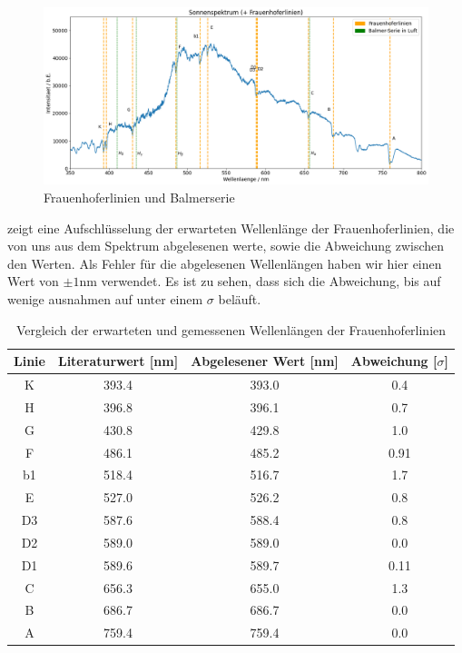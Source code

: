 \begin{figure}[H]
  \centering
  \includegraphics[width=\textwidth]{files/plots/spektrum_frauenhofer_balmer.png}
  \caption{Frauenhoferlinien und Balmerserie}
  \label{fig:spektrum_frauenhofer_balmer}
\end{figure}

 zeigt eine Aufschlüsselung der erwarteten Wellenlänge der Frauenhoferlinien, die von uns aus dem Spektrum abgelesenen werte, sowie die Abweichung zwischen den Werten. Als Fehler für die abgelesenen Wellenlängen haben wir hier einen Wert von $\pm 1 \si{\nano\meter}$ verwendet. Es ist zu sehen, dass sich die Abweichung, bis auf wenige ausnahmen auf unter einem $\sigma$ beläuft.

\begin{table}[h]
  \centering
  \caption{Vergleich der erwarteten und gemessenen Wellenlängen der Frauenhoferlinien}
  \vspace*{0.5em}
  \begin{tabular}{c|c|c|c}
      \hline
      Linie & Literaturwert [nm] & Abgelesener Wert [nm] & Abweichung [$\sigma$] \\
      \hline
      K  & 393.4 & 393.0 & 0.4 \\
      H  & 396.8 & 396.1 & 0.7 \\
      G  & 430.8 & 429.8 & 1.0 \\
      F  & 486.1 & 485.2 & 0.91 \\
      b1 & 518.4 & 516.7 & 1.7 \\
      E  & 527.0 & 526.2 & 0.8 \\
      D3 & 587.6 & 588.4 & 0.8 \\
      D2 & 589.0 & 589.0 & 0.0 \\
      D1 & 589.6 & 589.7 & 0.11 \\
      C  & 656.3 & 655.0 & 1.3 \\
      B  & 686.7 & 686.7 & 0.0 \\
      A  & 759.4 & 759.4 & 0.0 \\
      \hline
  \end{tabular}
  \label{tab:frauenhofer_vergleich}
\end{table}

